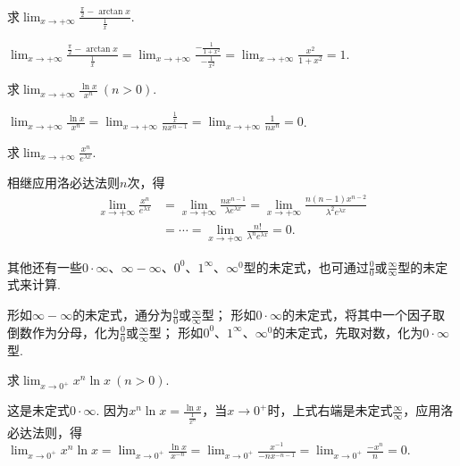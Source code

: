 \begin{example}
\def\l{\lim_{x\to+\infty}}%
求\(\l \frac{\frac{\pi}{2} - \arctan x}{\frac{1}{x}}\).
\begin{solution}
\(\l \frac{\frac{\pi}{2} - \arctan x}{\frac{1}{x}}
= \l \frac{-\frac{1}{1+x^2}}{-\frac{1}{x^2}}
= \l \frac{x^2}{1+x^2} = 1\).
\end{solution}
\end{example}

\begin{example}
\def\l{\lim_{x\to+\infty}}%
求\(\l \frac{\ln x}{x^n}\ (n>0)\).
\begin{solution}
\(\l \frac{\ln x}{x^n}
= \l \frac{\frac{1}{x}}{n x^{n-1}}
= \l \frac{1}{n x^n} = 0\).
\end{solution}
\end{example}

\begin{example}
\def\l{\lim_{x\to+\infty}}%
求\(\l \frac{x^n}{e^{\lambda x}}\).
\begin{solution}
相继应用洛必达法则\(n\)次，得\begin{align*}
\l \frac{x^n}{e^{\lambda x}}
&= \l \frac{n x^{n-1}}{\lambda e^{\lambda x}}
= \l \frac{n(n-1) x^{n-2}}{\lambda^2 e^{\lambda x}} \\
&= \dotsb = \l \frac{n!}{\lambda^n e^{\lambda x}}
= 0.
\end{align*}
\end{solution}
\end{example}

其他还有一些\(0 \cdot \infty\)、\(\infty - \infty\)、\(0^0\)、\(1^\infty\)、\(\infty^0\)型的未定式，也可通过\(\frac{0}{0}\)或\(\frac{\infty}{\infty}\)型的未定式来计算.

形如\(\infty - \infty\)的未定式，通分为\(\frac{0}{0}\)或\(\frac{\infty}{\infty}\)型；
形如\(0 \cdot \infty\)的未定式，将其中一个因子取倒数作为分母，化为\(\frac{0}{0}\)或\(\frac{\infty}{\infty}\)型；
形如\(0^0\)、\(1^\infty\)、\(\infty^0\)的未定式，先取对数，化为\(0 \cdot \infty\)型.

\begin{example}\label{example:微分中值定理.洛必达法则.零乘无穷大型1}
\def\l{\lim_{x\to0^+}}%
求\(\l x^n \ln x\ (n > 0)\).
\begin{solution}
这是未定式\(0\cdot\infty\).
因为\(x^n \ln x = \frac{\ln x}{\frac{1}{x^n}}\)，当\(x\to0^+\)时，上式右端是未定式\(\frac{\infty}{\infty}\)，应用洛必达法则，得%
\(\l x^n \ln x
= \l \frac{\ln x}{x^{-n}}
= \l \frac{x^{-1}}{-nx^{-n-1}}
= \l \frac{-x^n}{n}
= 0\).
\end{solution}
\end{example}

